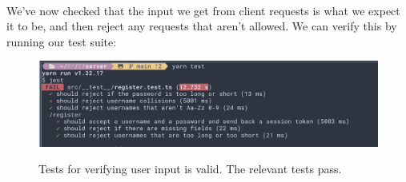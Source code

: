 \documentclass{report}
\begin{document}
\paragraph{}
We've now checked that the input we get from client requests is what we expect it to be, and then reject any requests that aren't allowed. We can verify this by running our test suite:

\begin{figure}[h!]
  \includegraphics[width=\linewidth]{./media/development/backend/tests/register/input_validity.png}
  \label{fig:registerValid1}
  \caption{Tests for verifying user input is valid. The relevant tests pass.}
\end{figure}

\printbibliography
\end{document}
